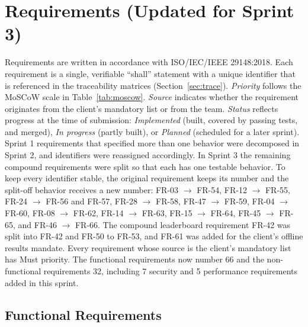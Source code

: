 \documentclass[12pt,letterpaper]{article}
\begin{document}
\section{Requirements (Updated for Sprint 3)}\label{sec:reqs}
Requirements are written in accordance with ISO/IEC/IEEE 29148:2018. Each
requirement is a single, verifiable ``shall'' statement with a unique identifier that
is referenced in the traceability matrices (Section~\ref{sec:trace}). \emph{Priority}
follows the MoSCoW scale in Table~\ref{tab:moscow}. \emph{Source} indicates whether
the requirement originates from the client's mandatory list or from the team.
\emph{Status} reflects progress at the time of submission: \emph{Implemented} (built,
covered by passing tests, and merged), \emph{In progress} (partly built), or
\emph{Planned} (scheduled for a later sprint). Sprint 1 requirements that specified
more than one behavior were decomposed in Sprint 2, and identifiers were reassigned
accordingly. In Sprint 3 the remaining compound requirements were split so that each
has one testable behavior. To keep every identifier stable, the original requirement
keeps its number and the split-off behavior receives a new number: FR-03 $\to$ FR-54,
FR-12 $\to$ FR-55, FR-24 $\to$ FR-56 and FR-57, FR-28 $\to$ FR-58, FR-47 $\to$ FR-59,
FR-04 $\to$ FR-60, FR-08 $\to$ FR-62, FR-14 $\to$ FR-63, FR-15 $\to$ FR-64,
FR-45 $\to$ FR-65, and FR-46 $\to$ FR-66. The compound leaderboard requirement FR-42
was split into FR-42 and FR-50 to FR-53, and FR-61 was added for the client's offline
results mandate. Every requirement whose source is the client's mandatory list has
Must priority. The functional requirements now number 66 and the non-functional
requirements 32, including 7 security and 5 performance requirements added in this
sprint.

\subsection{Functional Requirements}
\end{document}
